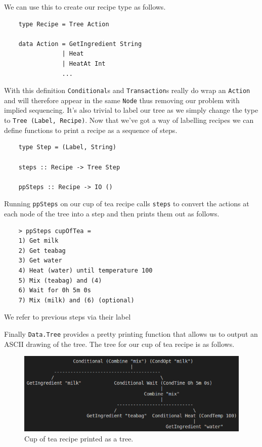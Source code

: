 \documentclass[11pt]{article}
\begin{document}
We can use this to create our recipe type as follows.

\begin{lstlisting}
    type Recipe = Tree Action

    data Action = GetIngredient String
                | Heat
                | HeatAt Int
                ...
\end{lstlisting}

With this definition \texttt{Conditional}s and \texttt{Transaction}s really do wrap an
\texttt{Action} and will therefore appear in the same \texttt{Node} thus removing our
problem with implied sequencing. It's also trivial to label our tree as we simply
change the type to \texttt{Tree (Label, Recipe)}. Now that we've got a way of
labelling recipes we can define functions to print a recipe as a sequence of steps.

\begin{lstlisting}
    type Step = (Label, String)

    steps :: Recipe -> Tree Step

    ppSteps :: Recipe -> IO ()
\end{lstlisting}

Running \texttt{ppSteps} on our cup of tea recipe calls \texttt{steps} to convert
the actions at each node of the tree into a step and then prints them out as follows.

\begin{lstlisting}
    > ppSteps cupOfTea =
    1) Get milk
    2) Get teabag
    3) Get water
    4) Heat (water) until temperature 100
    5) Mix (teabag) and (4)
    6) Wait for 0h 5m 0s
    7) Mix (milk) and (6) (optional)
\end{lstlisting}

We refer to previous steps via their label

Finally \texttt{Data.Tree} provides a pretty printing function that allows us
to output an ASCII drawing of the tree. The tree for our cup of tea recipe is
as follows.

\begin{figure}[h]
\includegraphics[width=\textwidth, keepaspectratio]{cupOfTea.png}
\centering
\caption{Cup of tea recipe printed as a tree.}
\end{figure}
\end{document}
